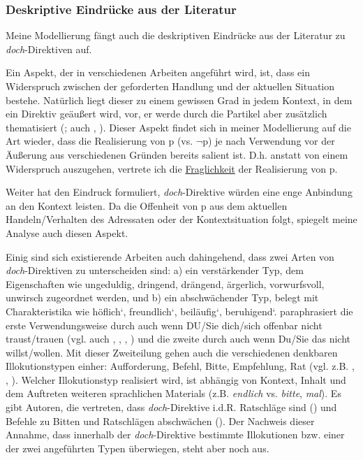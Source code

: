 {\subsubsection{Deskriptive Eindrücke aus der Literatur}
Meine Modellierung fängt auch die deskriptiven Eindrücke aus der Literatur zu \textit{doch}-Direktiven auf. 

Ein Aspekt, der in verschiedenen Arbeiten angeführt wird, ist, dass ein Widerspruch zwischen der geforderten Handlung und der aktuellen Situation bestehe. Natürlich liegt dieser zu einem gewissen Grad in jedem Kontext, in dem ein Direktiv geäußert wird, vor, er werde durch die Partikel aber zusätzlich thematisiert (\citealt[139]{Hentschel1986}; auch \citealt[118]{Thurmair1989}, \citealt[214]{Kwon2005}). Dieser Aspekt findet sich in meiner Modellierung auf die Art wieder, dass die Realisierung von p (vs. $\neg$p) je nach Verwendung vor der Äußerung aus verschiedenen Gründen bereits salient ist. D.h. anstatt von einem Widerspruch auszugehen, vertrete ich die \underline{Fraglichkeit} der Realisierung von p.

Weiter hat \citet[139]{Hentschel1986} den Eindruck formuliert, \textit{doch}-Direktive würden eine enge Anbindung an den Kontext leisten. Da die Offenheit von p aus dem aktuellen Handeln/Verhalten des Adressaten oder der Kontextsituation folgt, spie\-gelt meine Analyse auch diesen Aspekt.

Einig sind sich existierende Arbeiten auch dahingehend, dass zwei Arten von \textit{doch}-Direktiven zu unterscheiden sind: a) ein verstärkender Typ, dem Eigenschaften wie \glq ungeduldig\grq {}, \glq dringend\grq {}, \glq drängend\grq {}, \glq ärgerlich\grq {}, \glq vorwurfsvoll\grq {}, \glq unwirsch\grq {} zugeordnet werden, und b) ein abschwächender Typ, belegt mit Charakteristika wie \glq höflich‘, \glq freundlich‘, \glq beiläufig‘, \glq beruhigend‘. \citet[191]{Rinas2006} paraphrasiert die erste Verwendungsweise durch \glq auch wenn DU/Sie dich/sich offenbar nicht traust/trauen\grq {} (vgl. auch \citealt[188]{Franck1980}, \citealt[139]{Hentschel1986}, \citealt[113]{Helbig1990}, \citealt[91-92, 214]{Kwon2005}) und die zweite durch \glq auch wenn Du/Sie das nicht willst/wollen\grq {}. Mit dieser Zweiteilung gehen auch die verschiedenen denkbaren Illokutionstypen einher: Aufforderung, Befehl, Bitte, Empfehlung, Rat (vgl. z.B. \citealt[27]{Volmert1991}, \citealt[113]{Helbig1990}, \citealt[91-92, 214]{Kwon2005}). Welcher Illokutionstyp realisiert wird, ist abhängig von Kontext, Inhalt und dem Auftreten weiteren sprachlichen Materials (z.B. \textit{endlich} vs. \textit{bitte}, \textit{mal}). Es gibt Autoren, die vertreten, dass \textit{doch}-Direktive i.d.R. Ratschläge  sind (\citealt[402]{Ickler1994}) und Befehle  zu Bitten  und Ratschlägen abschwächen (\citealt[111]{Bublitz1978}). Der Nachweis dieser Annahme, dass innerhalb der \textit{doch}-Direktive bestimmte Illokutionen bzw. einer der zwei angeführten Typen überwiegen, steht aber noch aus.

}
